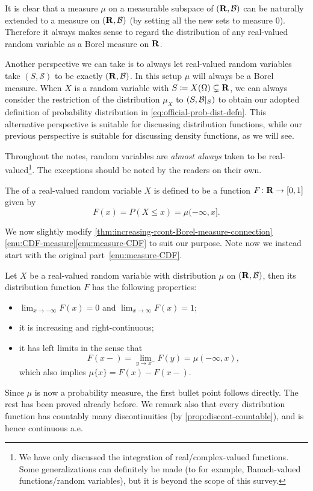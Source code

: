 It is clear that a measure $\mu$ on a measurable subspace of $(\mathbf{R},\mathcal{B})$ can be naturally extended to a measure on $(\mathbf{R},\mathcal{B})$ (by setting all the new sets to measure $0$). Therefore it always makes sense to regard the distribution of any real-valued random variable as a Borel measure on $\mathbf{R}$.

\begin{rem}
    Another perspective we can take is to always let real-valued random variables take $(S,\mathcal S)$ to be exactly $(\mathbf{R},\mathcal{B})$. In this setup $\mu$ will always be a Borel measure. When $X$ is a random variable with $S \coloneqq X(\Omega)\subsetneq \mathbf{R}$, we can always consider the restriction of the distribution $\mu_X$ to $(S,\mathcal{B}|_S)$ to obtain our adopted definition of probability distribution in \eqref{eq:official-prob-dist-defn}. This alternative perspective is suitable for discussing distribution functions, while our previous perspective is suitable for discussing density functions, as we will see.
\end{rem}

\begin{rem}
Throughout the notes, random variables are \emph{almost always} taken to be real-valued\footnote{We have only discussed the integration of real/complex-valued functions. Some generalizations can definitely be made (to for example, Banach-valued functions/random variables), but it is beyond the scope of this survey.}. The exceptions should be noted by the readers on their own.
\end{rem}

The  of a real-valued random variable $X$ is defined to be a function $F\colon \mathbf{R} \to [0,1]$ given by \[
    F(x) = P(X \leq x) = \mu(-\infty,x].
\]

We now slightly modify \cref{thm:increasing-rcont-Borel-measure-connection}\ref{enu:CDF-measure}\ref{enu:measure-CDF} to suit our purpose. Note now we instead start with the original part~\ref{enu:measure-CDF}.
\begin{thm} \label{thm:measure-CDF-prob}
    Let $X$ be a real-valued random variable with distribution $\mu$ on $(\mathbf{R},\mathcal{B})$, then its distribution function $F$ has the following properties:
        \begin{itemize}
            \item $\lim_{x \to -\infty} F(x) = 0$ and $\lim_{x \to \infty} F(x) = 1$;
            \item it is increasing and right-continuous; 
            \item it has left limits in the sense that \[
                F(x-) = \lim_{y \to x^-} F(y) = \mu(-\infty,x),
            \] which also implies $\mu\{x\} = F(x) - F(x-)$.
        \end{itemize}
\end{thm}
Since $\mu$ is now a probability measure, the first bullet point follows directly. The rest has been proved already before. We remark also that every distribution function has countably many discontinuities (by \cref{prop:discont-countable}), and is hence continuous a.e.

